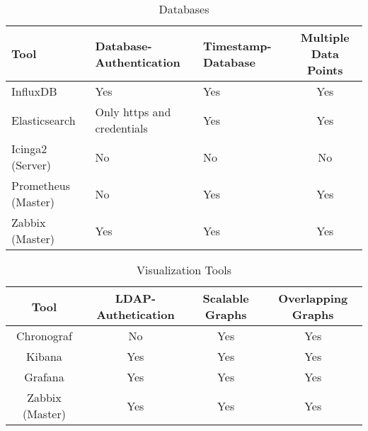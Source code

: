 \begin{table}
\centering

\label{tab:database}
\begin{tabular}{p{3cm}p{3cm}p{3cm}c}
	\hline
Tool & Database-Authentication     & Timestamp-Database          & Multiple Data Points        \\
\hline
InfluxDB                     & Yes & Yes                         & Yes                         \\
Elasticsearch                & Only https and credentials  & Yes & Yes                         \\
Icinga2 (Server)             & No                          & No                          & No                          \\
Prometheus (Master)          & No                          & Yes & Yes                         \\
Zabbix (Master)              & Yes                         & Yes                         & Yes\\
\hline
\end{tabular}
\caption{Databases}
\end{table}

\begin{table}
\centering

\label{tab:Visualization}
\begin{tabular}{cccc}
	\hline
Tool & LDAP-Authetication         & Scalable Graphs             & Overlapping Graphs          \\
\hline
Chronograf                   & No & Yes                         & Yes                         \\
Kibana                       & Yes                        & Yes & Yes                         \\
Grafana                      & Yes                        & Yes & Yes                         \\
Zabbix (Master)              & Yes                        & Yes                         & Yes\\
\hline
\end{tabular}
\caption{Visualization Tools}
\end{table}

